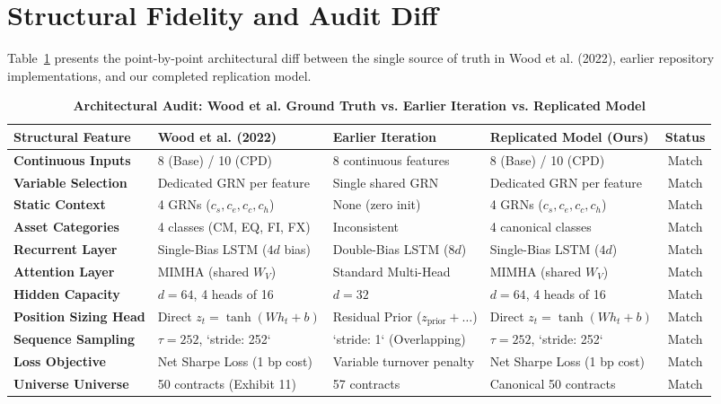 \documentclass[11pt,a4paper]{article}
\begin{document}
\section{Structural Fidelity and Audit Diff}

Table~\ref{tab:audit_diff} presents the point-by-point architectural diff between the single source of truth in Wood et al. (2022), earlier repository implementations, and our completed replication model.

\begin{table}[H]
\centering
\small
\caption{\textbf{Architectural Audit: Wood et al. Ground Truth vs. Earlier Iteration vs. Replicated Model}}
\label{tab:audit_diff}
\vspace{0.4em}
\begin{tabularx}{\textwidth}{l X X X c}
\toprule
\textbf{Structural Feature} & \textbf{Wood et al. (2022)} & \textbf{Earlier Iteration} & \textbf{Replicated Model (Ours)} & \textbf{Status} \\
\midrule
\textbf{Continuous Inputs} & 8 (Base) / 10 (CPD) & 8 continuous features & 8 (Base) / 10 (CPD) & Match \\
\textbf{Variable Selection} & Dedicated GRN per feature & Single shared GRN & Dedicated GRN per feature & Match \\
\textbf{Static Context} & 4 GRNs ($c_s, c_e, c_c, c_h$) & None (zero init) & 4 GRNs ($c_s, c_e, c_c, c_h$) & Match \\
\textbf{Asset Categories} & 4 classes (CM, EQ, FI, FX) & Inconsistent & 4 canonical classes & Match \\
\textbf{Recurrent Layer} & Single-Bias LSTM ($4d$ bias) & Double-Bias LSTM ($8d$) & Single-Bias LSTM ($4d$) & Match \\
\textbf{Attention Layer} & MIMHA (shared $W_V$) & Standard Multi-Head & MIMHA (shared $W_V$) & Match \\
\textbf{Hidden Capacity} & $d = 64$, 4 heads of 16 & $d = 32$ & $d = 64$, 4 heads of 16 & Match \\
\textbf{Position Sizing Head} & Direct $z_t = \tanh(W h_t + b)$ & Residual Prior ($z_{\text{prior}} + \dots$) & Direct $z_t = \tanh(W h_t + b)$ & Match \\
\textbf{Sequence Sampling} & $\tau = 252$, `stride: 252` & `stride: 1` (Overlapping) & $\tau = 252$, `stride: 252` & Match \\
\textbf{Loss Objective} & Net Sharpe Loss (1 bp cost) & Variable turnover penalty & Net Sharpe Loss (1 bp cost) & Match \\
\textbf{Universe Universe} & 50 contracts (Exhibit 11) & 57 contracts & Canonical 50 contracts & Match \\
\bottomrule
\end{tabularx}
\end{table}
\end{document}
